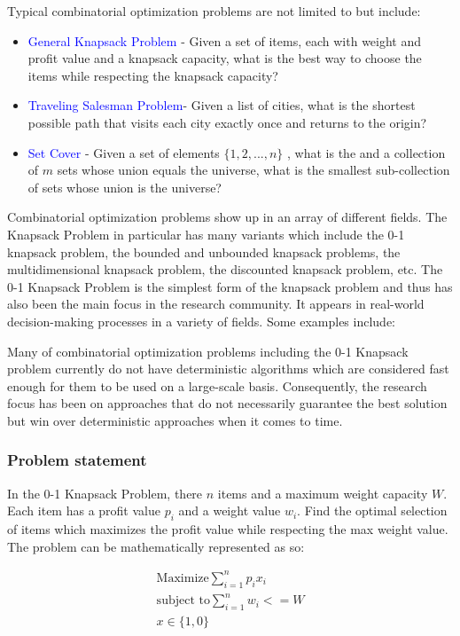 \documentclass[titlepage]{article}
\begin{document}
Typical combinatorial optimization problems are not limited to but include:
\begin{itemize}
    \item \textcolor{blue}{General Knapsack Problem} - Given a set of items, each with weight and profit value and a knapsack capacity, what is the best way to choose the items while respecting the knapsack capacity?
    \item \textcolor{blue}{Traveling Salesman Problem}- Given a list of cities, what is the shortest possible path that visits each city exactly once and returns to the origin?
    \item \textcolor{blue}{Set Cover} - Given a set of elements $\{1, 2, ..., n\}$ , what is the and a collection of $m$ sets whose union equals the universe, what is the smallest sub-collection of sets whose union is the universe?
\end{itemize}

Combinatorial optimization problems show up in an array of different fields. The Knapsack Problem in particular has many variants which include the 0-1 knapsack problem, the bounded and unbounded knapsack problems, the multidimensional knapsack problem, the discounted knapsack problem, etc. The 0-1 Knapsack Problem is the simplest form of the knapsack problem and thus has also been the main focus in the research community. It appears in real-world decision-making processes in a variety of fields. Some examples include: 

Many of combinatorial optimization problems including the 0-1 Knapsack problem currently do not have deterministic algorithms which are considered fast enough for them to be used on a large-scale basis. Consequently, the research focus has been on approaches that do not necessarily guarantee the best solution but win over deterministic approaches when it comes to time. 

\subsubsection*{Problem statement}
In the 0-1 Knapsack Problem, there $n$ items and a maximum weight capacity $W$. Each item has a profit value $p_i$ and a weight value $w_i$. Find the optimal selection of items which maximizes the profit value while respecting the max weight value. The problem can be mathematically represented as so:

\begin{gather}
    \text{Maximize} \sum_{i = 1}^{n} p_i x_i \\
    \text{subject to} \sum_{i = 1}^{n} w_i <= W \\
    x \in \{1, 0\}
\end{gather}
\end{document}
